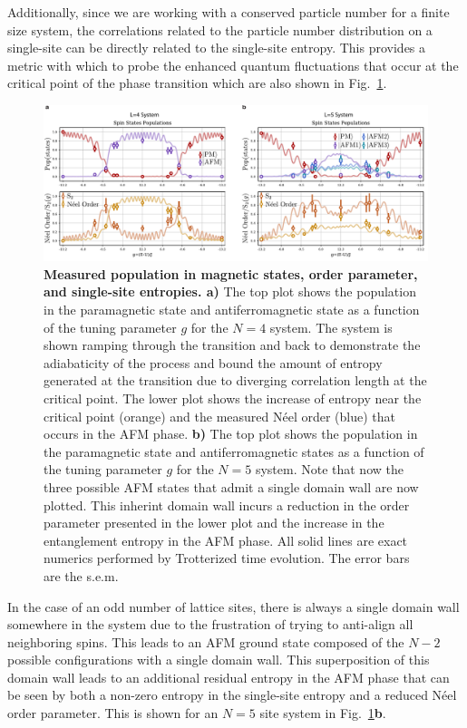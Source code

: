 Additionally, since we are working with a conserved particle number for a finite size system, the correlations related to the particle number distribution on a single-site can be directly related to the single-site entropy. This provides a metric with which to probe the enhanced quantum fluctuations that occur at the critical point of the phase transition which are also shown in Fig.~\ref{fig:ising_N4N5}.

\begin{figure}[t!]
		\includegraphics[width=\columnwidth]{figures/ch3/ising_data/IsingN4N5Combo_2v2edit.pdf} 
		\caption{\textbf{Measured population in magnetic states, order parameter, and single-site entropies. a)}  The top plot shows the population in the paramagnetic state and antiferromagnetic state as a function of the tuning parameter $g$ for the $N=4$ system. The system is shown ramping through the transition and back to demonstrate the adiabaticity of the process and bound the amount of entropy generated at the transition due to diverging correlation length at the critical point. The lower plot shows the increase of entropy near the critical point (orange) and the measured N\'eel order (blue) that occurs in the AFM phase. \textbf{b)} The top plot shows the population in the paramagnetic state and antiferromagnetic states as a function of the tuning parameter $g$ for the $N=5$ system. Note that now the three possible AFM states that admit a single domain wall are now plotted. This inherint domain wall incurs a reduction in the order parameter presented in the lower plot and the increase in the entanglement entropy in the AFM phase. All solid lines are exact numerics performed by Trotterized time evolution. The error bars are the s.e.m.}
		\label{fig:ising_N4N5}	
\end{figure}

In the case of an odd number of lattice sites, there is always a single domain wall somewhere in the system due to the frustration of trying to anti-align all neighboring spins. This leads to an AFM ground state composed of the $N-2$ possible configurations with a single domain wall. This superposition of this domain wall leads to an additional residual entropy in the AFM phase that can be seen by both a non-zero entropy in the single-site entropy and a reduced N\'eel order parameter. This is shown for an $N=5$ site system in Fig.~\ref{fig:ising_N4N5}\textbf{b}.

